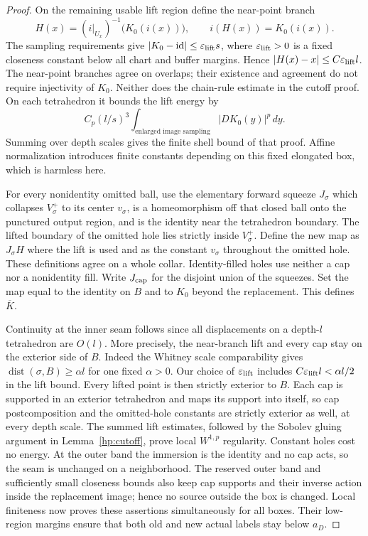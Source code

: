 \documentclass[11pt]{article}
\numberwithin{equation}{section}
\theoremstyle{definition}
\theoremstyle{remark}
\DeclareMathOperator{\dist}{dist}
\begin{document}
\begin{proof}
On the remaining usable lift region define the near-point branch
\begin{equation}\label{qt:central-lift}
 H(x)=(i|_{U_x})^{-1}\bigl(K_0(i(x))\bigr),
 \qquad i(H(x))=K_0(i(x)).
\end{equation}
The sampling requirements give
$|K_0-\mathrm{id}|\le\varepsilon_{\rm lift}s$, where
$\varepsilon_{\rm lift}>0$ is a fixed closeness constant below all
chart and buffer margins.  Hence
$|H(x)-x|\le C\varepsilon_{\rm lift}l$.
The near-point branches agree on overlaps;
their existence and agreement do not require injectivity of $K_0$.
Neither does the chain-rule estimate in the cutoff proof.  On each
tetrahedron it bounds the lift energy by
\[
 C_p(l/s)^3
       \int_{\text{enlarged image sampling}} |DK_0(y)|^p\,dy.
\]
Summing over depth scales gives the finite shell bound of that
proof.  Affine normalization introduces finite constants depending
on this fixed elongated box, which is harmless here.

For every nonidentity omitted ball, use the elementary forward
squeeze $J_{\sigma}$ which collapses $V_{\sigma}^+$ to its center $v_{\sigma}$, is a
homeomorphism off that closed ball onto the punctured output
region, and is the identity near the tetrahedron boundary.
The lifted boundary of the omitted hole lies strictly inside
$V_{\sigma}^+$.  Define the new map as $J_{\sigma}H$ where the lift is used and
as the constant $v_{\sigma}$ throughout the omitted hole.  These definitions
agree on a whole collar.  Identity-filled holes use neither a cap
nor a nonidentity fill.  Write $J_{\rm cap}$ for the disjoint union
of the squeezes.  Set the map equal to the identity on $B$ and to
$K_0$ beyond the replacement.  This defines $\overline K$.

Continuity at the inner seam follows since all displacements on a
depth-$l$ tetrahedron are $O(l)$.  More precisely, the near-branch
lift and every cap stay on the exterior side of $B$.  Indeed the
Whitney scale comparability gives $\dist(\sigma,B)\geq\alpha l$ for one
fixed $\alpha>0$.  Our choice of $\varepsilon_{\rm lift}$ includes
$C\varepsilon_{\rm lift}l<\alpha l/2$ in the lift bound.
Every lifted point is then strictly exterior to $B$.  Each
cap is supported in an exterior tetrahedron and maps its support into
itself, so cap postcomposition and the omitted-hole constants are
strictly exterior as well, at every depth scale.  The summed lift estimates, followed by the Sobolev gluing argument in
Lemma~\ref{hp:cutoff}, prove local $W^{1,p}$ regularity.  Constant
holes cost no energy.  At the outer band the immersion is the
identity and no cap acts, so the seam is unchanged on a neighborhood.
The reserved outer band and sufficiently small closeness bounds also
keep cap supports and their inverse action inside the replacement
image; hence no source outside the box is changed.  Local finiteness
now proves these assertions simultaneously for all boxes.  Their
low-region margins ensure that both old and new actual labels stay
below $a_D$.


\end{proof}
\end{document}
